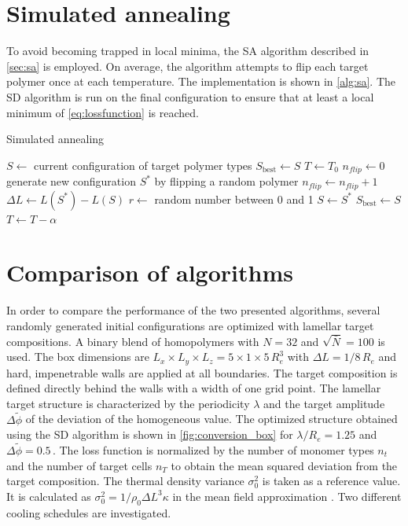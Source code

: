 \documentclass[bachelor,       %
               oneside,        %
               BCOR10mm,       %
               ngerman, english %
               ]{GAUBM}
\begin{document}
\section{Simulated annealing}

To avoid becoming trapped in local minima, the \ac{SA} algorithm described in \autoref{sec:sa} is employed. On average, the algorithm attempts to flip each target polymer once at each temperature. The implementation is shown in \autoref{alg:sa}. The \ac{SD} algorithm is run on the final configuration to ensure that at least a local minimum of \autoref{eq:lossfunction} is reached.

\begin{algorithm}[H]
\caption{Simulated annealing}\label{alg:sa}
\begin{algorithmic}[1]
\State $S \gets$ current configuration of target polymer types
\State $S_\text{best}\gets S$
\State $T \gets T_0$
    \State $n_{flip} \gets 0$
        \State generate new configuration $S^*$ by flipping a random polymer
        \State $n_{flip}\gets n_{flip}+1$
        \State $\Delta L\gets L(S^*)-L(S)$
        \State $r\gets$ random number between 0 and 1
            \State $S\gets S^*$
        \EndIf
    \EndWhile
{}
    \State $S_\text{best}\gets S$ 
\EndIf
\State $T\gets T-\alpha$ 
\EndWhile
\end{algorithmic}
\end{algorithm}

\section{Comparison of algorithms}


In order to compare the performance of the two presented algorithms, several randomly generated initial configurations are optimized with lamellar target compositions. A binary blend of homopolymers with $N=32$ and $\sqrt{\bar N}=100$ is used. The box dimensions are $L_x\times L_y\times L_z=5\times1\times5\,R_e^3$ with $\Delta L=1/8\,R_e$ and hard, impenetrable  walls are applied at all boundaries. The target composition is defined directly behind the walls with a width of one grid point. The lamellar target structure is characterized by the periodicity $\lambda$ and the target amplitude $\Delta\tilde\phi$ of the deviation of the homogeneous value.  The optimized structure obtained using the \ac{SD} algorithm is shown in \autoref{fig:conversion_box} for $\lambda/R_e=1.25$ and $\Delta\tilde\phi=0.5\,.$ The loss function is normalized by the number of monomer types $n_t$ and the number of target cells $n_T$ to obtain the mean squared deviation from the target composition. The thermal density variance $\sigma_0^2$ is taken as a reference value. It is calculated as $\sigma_0^2=1/\rho_0\Delta L^3\kappa$ in the mean field approximation \cite{Daoulas06}. Two different cooling schedules are investigated.
\end{document}

